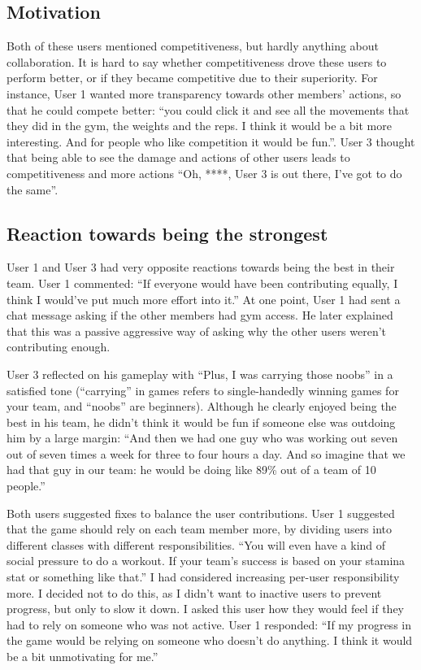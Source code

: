 \documentclass{l4proj}
\begin{document}
\subsection{Motivation}

Both of these users mentioned competitiveness, but hardly anything about collaboration. It is hard to say whether competitiveness drove these users to perform better, or if they became competitive due to their superiority. For instance, User 1 wanted more transparency towards other members' actions, so that he could compete better: ``you could click it and see all the movements that they did in the gym, the weights and the reps. I think it would be a bit more interesting. And for people who like competition it would be fun.''. User 3 thought that being able to see the damage and actions of other users leads to competitiveness and more actions ``Oh, ****, User 3 is out there, I've got to do the same''. 

\subsection{Reaction towards being the strongest}

User 1 and User 3 had very opposite reactions towards being the best in their team. User 1 commented: ``If everyone would have been contributing equally, I think I would've put much more effort into it.'' At one point, User 1 had sent a chat message asking if the other members had gym access. He later explained that this was a passive aggressive way of asking why the other users weren't contributing enough. 

User 3 reflected on his gameplay with ``Plus, I was carrying those noobs'' in a satisfied tone (``carrying'' in games refers to single-handedly winning games for your team, and ``noobs'' are beginners). Although he clearly enjoyed being the best in his team, he didn't think it would be fun if someone else was outdoing him by a large margin: ``And then we had one guy who was working out seven out of seven times a week for three to four hours a day. And so imagine that we had that guy in our team: he would be doing like 89\% out of a team of 10 people.'' 

Both users suggested fixes to balance the user contributions. User 1 suggested that the game should rely on each team member more, by dividing users into different classes with different responsibilities. ``You will even have a kind of social pressure to do a workout. If your team's success is based on your stamina stat or something like that.'' I had considered increasing per-user responsibility more. I decided not to do this, as I didn't want to inactive users to prevent progress, but only to slow it down. I asked this user how they would feel if they had to rely on someone who was not active. User 1 responded: ``If my progress in the game would be relying on someone who doesn't do anything. I think it would be a bit unmotivating for me.'' 
\end{document}

